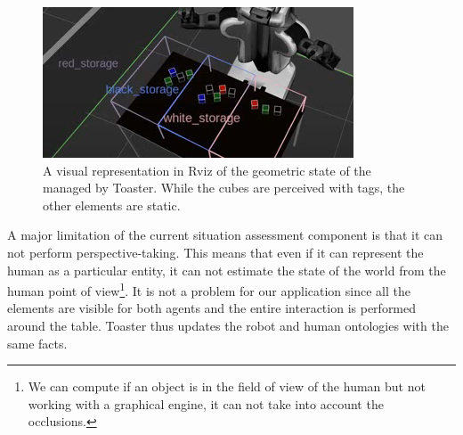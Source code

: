 \begin{figure}[!ht]
\centering
\includegraphics[scale=0.70]{figures/chapter5/toaster.png}
\caption{\label{fig:chap5_toaster} A visual representation in Rviz of the geometric state of the managed by Toaster. While the cubes are perceived with tags, the other elements are static.
 }
\end{figure}

A major limitation of the current situation assessment component is that it can not perform perspective-taking. This means that even if it can represent the human as a particular entity, it can not estimate the state of the world from the human point of view\footnote{We can compute if an object is in the field of view of the human but not working with a graphical engine, it can not take into account the occlusions.}. It is not a problem for our application since all the elements are visible for both agents and the entire interaction is performed around the table. Toaster thus updates the robot and human ontologies with the same facts.
